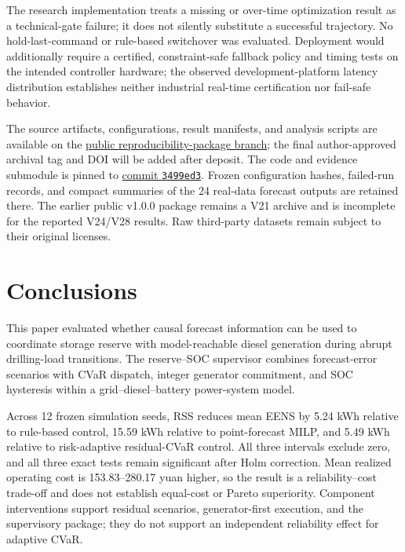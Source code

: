 The research implementation treats a missing or over-time optimization result
as a technical-gate failure; it does not silently substitute a successful
trajectory. No hold-last-command or rule-based switchover was evaluated.
Deployment would additionally require a certified, constraint-safe fallback
policy and timing tests on the intended controller hardware; the observed
development-platform latency distribution establishes neither industrial
real-time certification nor fail-safe behavior.

The source artifacts, configurations, result manifests, and analysis scripts
are available on the
\href{https://github.com/shixingzhang1994-byte/rig-energy-forecasting/tree/reproducibility-package-v24-v28}{public reproducibility-package branch};
the final author-approved archival tag and DOI will be added after deposit. The
code and evidence submodule is pinned to
\href{https://github.com/shixingzhang1994-byte/rig-energy-forecasting/commit/3499ed37cb93684b90a30926be95400ac3f0a72c}{commit \texttt{3499ed3}}. Frozen configuration
hashes, failed-run records, and compact summaries of the 24 real-data forecast
outputs are retained there. The earlier public v1.0.0 package remains a V21
archive and is incomplete for the reported V24/V28 results. Raw third-party
datasets remain subject to their original licenses.

\section{Conclusions}\label{conclusions}

This paper evaluated whether causal forecast information can be used to
coordinate storage reserve with model-reachable diesel generation during abrupt
drilling-load transitions. The reserve--SOC supervisor combines forecast-error
scenarios with CVaR dispatch, integer generator commitment, and SOC hysteresis
within a grid--diesel--battery power-system model.

Across 12 frozen simulation seeds, RSS reduces mean EENS by 5.24 kWh relative
to rule-based control, 15.59 kWh relative to point-forecast MILP, and 5.49 kWh
relative to risk-adaptive residual-CVaR control. All three intervals exclude
zero, and all three exact tests remain significant after Holm correction. Mean realized operating
cost is 153.83--280.17 yuan higher, so the result is a reliability--cost
trade-off and does not establish equal-cost or Pareto superiority. Component
interventions support residual scenarios, generator-first execution, and the
supervisory package; they do not support an
independent reliability effect for adaptive CVaR.

